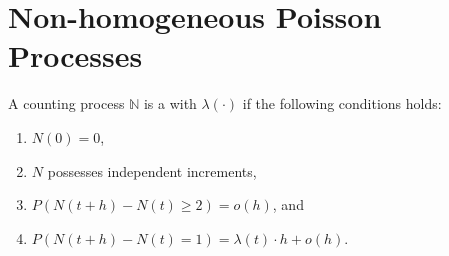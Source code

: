 \section{Non-homogeneous Poisson Processes}

\begin{definition}
A counting process $ \mathbb{N} $ is a  with  $\lambda(\cdot) $ if the following conditions holds:
\begin{enumerate}
  \item $ N(0) = 0 $,
  \item $ N $ possesses independent increments,
  \item $ P(N(t + h) - N(t) \ge 2) = o(h) $, and
  \item $ P(N(t + h) - N(t) = 1) = \lambda(t) \cdot h + o(h) $.
\end{enumerate}
\end{definition}


